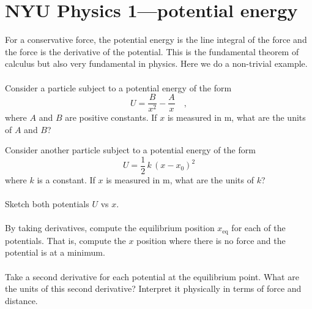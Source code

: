 \documentclass[12pt]{article}
\begin{document}
\renewcommand{\deg}{\mathrm{deg}}
\newcommand{\kg}{\mathrm{kg}}
\newcommand{\m}{\mathrm{m}}
\newcommand{\s}{\mathrm{s}}
\newcommand{\mps}{\m\,\s^{-1}}
\thispagestyle{empty}

\section*{NYU Physics 1---potential energy}

For a conservative force, the potential energy is the line integral of
the force and the force is the derivative of the potential.  This is
the fundamental theorem of calculus but also very fundamental in
physics.  Here we do a non-trivial example.

\paragraph{\theproblem}%
Consider a particle subject to a potential energy of the form
\begin{equation}
U = \frac{B}{x^2} - \frac{A}{x} \quad ,
\label{eq:hard}
\end{equation}
where $A$ and $B$ are positive constants.  If $x$ is measured in $\m$,
what are the units of $A$ and $B$?

Consider another particle subject to a potential energy of the form
\begin{equation}
U = \frac{1}{2}\,k\,(x-x_0)^2
\label{eq:easy}
\end{equation}
where $k$ is a constant.  If $x$ is measured in $\m$, what are
the units of $k$?

\paragraph{\theproblem}%
Sketch both potentials $U$ vs $x$.

\paragraph{\theproblem}%
By taking derivatives, compute the equilibrium position
$x_\mathrm{eq}$ for each of the potentials.  That is, compute the $x$
position where there is no force and the potential is at a minimum.

\paragraph{\theproblem}%
Take a second derivative for each potential at the equilibrium point.
What are the units of this second derivative?  Interpret it physically
in terms of force and distance.
\end{document}
